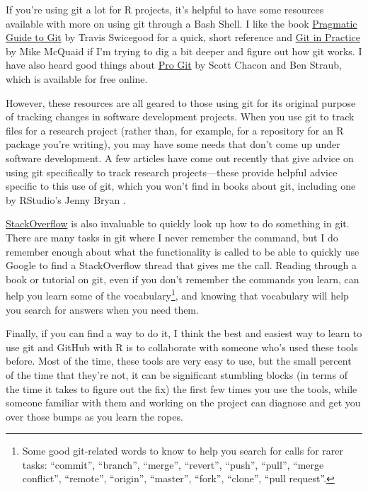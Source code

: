 \documentclass[]{tufte-book}
\begin{document}
If you're using git a lot for R projects, it's helpful to have some resources available with
more on using git through a Bash Shell. I like the book \href{https://www.amazon.com/Pragmatic-Guide-Git-Programmers/dp/1934356727/ref=sr_1_28?keywords=git\&qid=1554173700\&s=gateway\&sr=8-28}{Pragmatic Guide to Git} by Travis Swicegood for a quick, short reference and
\href{https://www.amazon.com/Git-Practice-Techniques-Mike-McQuaid/dp/1617291978/ref=sr_1_60?keywords=git\&qid=1554174811\&s=gateway\&sr=8-60}{Git in Practice} by Mike McQuaid if I'm trying to dig a bit deeper
and figure out how git works.
I have also heard good things about \href{https://git-scm.com/book/en/v2}{Pro Git} by Scott Chacon and
Ben Straub, which is available for free online.

However, these resources are all geared to those using git for its original purpose of
tracking changes in software development projects. When you use git to track files for a research
project (rather than, for example, for a repository for an R package you're writing), you
may have some needs that don't come up under software development. A few articles have come
out recently that give advice on using git specifically to track research projects---these provide
helpful advice specific to this use of git, which you won't find in books about git, including
one by RStudio's Jenny Bryan \citep{bryan2018excuse}.

\href{https://stackoverflow.com/}{StackOverflow}
is also invaluable to quickly look up how to do something in git. There are
many tasks in git where I never remember the command, but I do remember enough about what
the functionality is called to be able to quickly use Google to find a StackOverflow thread
that gives me the call. Reading through a book or tutorial on git, even if you don't
remember the commands you learn, can help you learn some of the vocabulary\footnote{Some good git-related
  words to know to help you search for calls for rarer tasks: ``commit'', ``branch'', ``merge'', ``revert'',
  ``push'', ``pull'', ``merge conflict'', ``remote'', ``origin'', ``master'', ``fork'', ``clone'', ``pull request''.},
and knowing that vocabulary will help you search for answers when you need them.

Finally, if you can find a way to do it, I think the best and easiest way to learn to use git
and GitHub with R is to collaborate with someone who's used these tools before. Most of the
time, these tools are very easy to use, but the small percent of the time that they're not,
it can be significant stumbling blocks (in terms of the time it takes to figure out the fix)
the first few times you use the tools, while someone familiar with them and working on the
project can diagnose and get you over those bumps as you learn the ropes.
\end{document}

